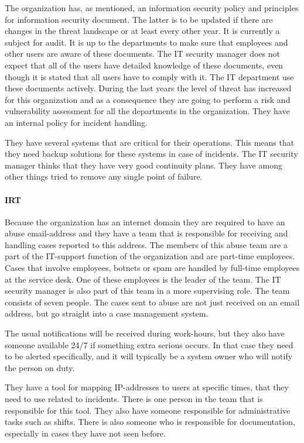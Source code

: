 The organization has, as mentioned, an information security policy and principles for information security document. The latter is to be updated if there are changes in the threat landscape or at least every other year. It is currently a subject for audit. It is up to the departments to make sure that employees and other users are aware of these documents. The IT security manager does not expect that all of the users have detailed knowledge of these documents, even though it is stated that all users have to comply with it. The IT department use these documents actively. %
During the last years the level of threat has increased for this organization and as a consequence they are going to perform a risk and vulnerability assessment for all the departments in the organization. They have an internal policy for incident handling.

They have several systems that are critical for their operations. This means that they need backup solutions for these systems in case of incidents. The IT security manager thinks that they have very good continuity plans. They have among other things tried to remove any single point of failure.

\paragraph{\acl{IRT}}
Because the organization has an internet domain they are required to have an abuse email-address and they have a team that is responsible for receiving and handling cases reported to this address. The members of this abuse team are a part of the IT-support function of the organization and are part-time employees. Cases that involve employees, botnets or spam are handled by full-time employees at the service desk. One of these employees is the leader of the team. The IT security manager is also part of this team in a more supervising role. The team consists of seven people. The cases sent to abuse are not just received on an email address, but go straight into a case management system. 

The usual notifications will be received during work-hours, but they also have someone available 24/7 if something extra serious occurs. In that case they need to be alerted specifically, and it will typically be a system owner who will notify the person on duty.

They have a tool for mapping IP-addresses to users at specific times, that they need to use related to incidents. There is one person in the team that is responsible for this tool. They also have someone responsible for administrative tasks such as shifts. There is also someone who is responsible for documentation, especially in cases they have not seen before.

